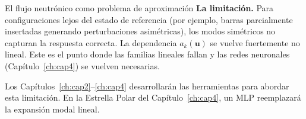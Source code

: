 \begin{estrella}{El flujo neutrónico como problema de aproximación}
\textbf{La limitación.}
Para configuraciones lejos del estado de referencia (por ejemplo, barras
parcialmente insertadas generando perturbaciones asimétricas), los modos
simétricos no capturan la respuesta correcta. La dependencia $a_k(\bm{u})$
se vuelve fuertemente no lineal. Este es el punto donde las familias
lineales fallan y las redes neuronales (Capítulo~\ref{ch:cap4}) se vuelven
necesarias.

Los Capítulos~\ref{ch:cap2}--\ref{ch:cap4} desarrollarán las herramientas
para abordar esta limitación. En la Estrella Polar del
Capítulo~\ref{ch:cap4}, un MLP reemplazará la expansión modal lineal.
\end{estrella}

\printbibliography[heading=subbibliography]
